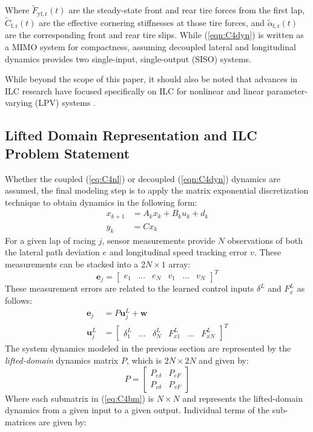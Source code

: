 \documentclass[9pt,shortpaper,twoside,web]{ieeecolor}
\begin{document}
Where $\tilde{F}_\mathrm{yf,r}(t)$ are the steady-state front and rear tire forces from the first lap, $\tilde{C}_\mathrm{f,r}(t)$ are the effective cornering stiffnesses at those tire forces, and $\tilde{\alpha}_\mathrm{f,r}(t)$ are the corresponding front and rear tire slips. While (\ref{eqn:C4dyn}) is written as a MIMO system for compactness, assuming decoupled lateral and longitudinal 
dynamics provides two single-input, single-output (SISO) systems. 

While beyond the scope of this paper, it should also be noted that advances in ILC research have focused specifically on ILC for nonlinear \cite{xunonlinear} and linear parameter-varying (LPV) systems \cite{de2017iterative}. 

\subsection{Lifted Domain Representation and ILC \newline Problem Statement}
\label{sec:liftedD}
Whether the coupled (\ref{eq:C4nl}) or decoupled (\ref{eqn:C4dyn}) dynamics are assumed, the
final modeling step is to apply the matrix exponential discretization technique to obtain dynamics in the following form:
\begin{align}
\label{C4ad}
x_{k+1} &= A_kx_k + B_ku_k + d_k \\
y_{k}   &= Cx_k
\end{align}
For a given lap of racing $j$, sensor measurements provide $N$ observations of both the lateral path deviation $e$ and longitudinal
speed tracking error $v$. These measurements can be stacked into a 2$N \times 1$ array: 
\begin{equation}
\mathbf{e}_j = \begin{bmatrix} e_1 & \hdots & e_N & v_1 & \hdots & v_N \end{bmatrix}^T
\end{equation} 
These measurement errors are related to the learned control inputs $\delta^L$ and $F^L_x$ as follows: 
\begin{align}
\label{eq:liftedDomain}
\mathbf{e}_j &= P\mathbf{u}^L_j + \mathbf{w} \\
\mathbf{u}^L_j &= \begin{bmatrix} \delta^L_1 & \hdots & \delta^L_N & F^L_{x1} & \hdots & F^L_{xN} \end{bmatrix}^T
\end{align}
The system dynamics modeled in the previous section are represented by the \textit{lifted-domain} dynamics matrix $P$,
which is $\mathrm{2}N \times \mathrm{2}N$ and given by:
\begin{equation}
\label{eq:C4bm}
P=\left[
\begin{array}{c|c}
P_{e\delta} & P_{eF} \\ \hline
P_{v\delta} & P_{vF} 
\end{array}\right]
\end{equation}
Where each submatrix in (\ref{eq:C4bm}) is $N \times N$ and represents the lifted-domain dynamics from a given input to a given output. 
Individual terms of the sub-matrices are given by:
\end{document}
